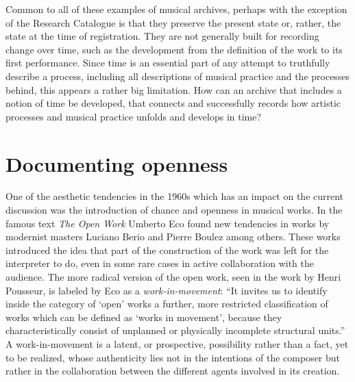 \documentclass[11pt,a4paper]{article}
\begin{document}
Common to all of these examples of musical archives, perhaps with the exception of the Research Catalogue is that they preserve the present state or, rather, the state at the time of registration. They are not generally built for recording change over time, such as the development from the definition of the work to its first performance. Since time is an essential part of any attempt to truthfully describe a process, including all descriptions of musical practice and the processes behind, this appears a rather big limitation. How can an archive that includes a notion of time be developed, that connects and successfully records how artistic processes and musical practice unfolds and develops in time?



\section*{Documenting openness}
\label{sec:open-work-repetition}
One of the aesthetic tendencies in the 1960s which has an impact on the current discussion was the introduction of chance and openness in musical works. In the famous text \emph{The Open Work} Umberto Eco \citep{eco68} found new tendencies in works by modernist masters Luciano Berio and Pierre Boulez among others. These works introduced the idea that part of the construction of the work was left for the interpreter to do, even in some rare cases in active collaboration with the audience. The more radical version of the open work, seen in the work by Henri Pousseur, is labeled by Eco as a \emph{work-in-movement}: ``It invites us to identify inside the category of `open' works a further, more restricted classification of works which can be defined as `works in movement', because they characteristically consist of unplanned or physically incomplete structural units.'' \citep[p. 22]{eco68} A work-in-movement is a latent, or prospective, possibility rather than a fact, yet to be realized, whose authenticity lies not in the intentions of the composer but rather in the collaboration between the different agents involved in its creation.\citep{eco68,frisk08} %
\end{document}

